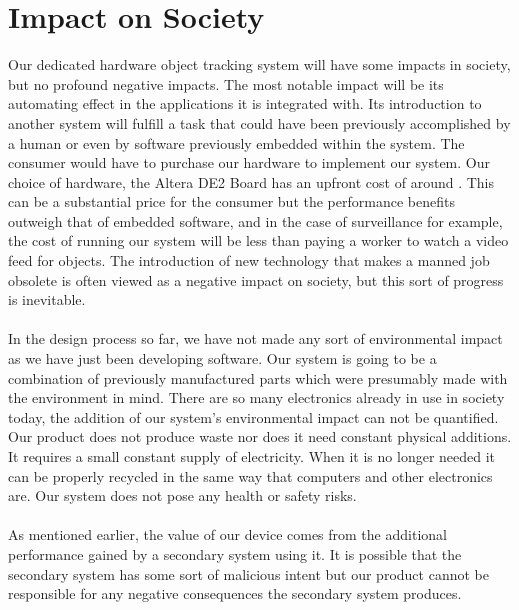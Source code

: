 \documentclass[11pt]{article} %
\begin{document}
\section{Impact on Society}
Our dedicated hardware object tracking system will have some impacts in society, but no profound negative impacts. The most notable impact will be its automating effect in the applications it is integrated with. Its introduction to another system will fulfill a task that could have been previously accomplished by a human or even by software previously embedded within the system. The consumer would have to purchase our hardware to implement our system. Our choice of hardware, the Altera DE2 Board has an upfront cost of around . This can be a substantial price for the consumer but the performance benefits outweigh that of embedded software, and in the case of surveillance for example, the cost of running our system will be less than paying a worker to watch a video feed for objects. The introduction of new technology that makes a manned job obsolete is often viewed as a negative impact on society, but this sort of progress is inevitable. \\\\
In the design process so far, we have not made any sort of environmental impact as we have just been developing software. Our system is going to be a combination of previously manufactured parts which were presumably made with the environment in mind. There are so many electronics already in use in society today, the addition of our system's environmental impact can not be quantified. Our product does not produce waste nor does it need constant physical additions. It requires a small constant supply of electricity. When it is no longer needed it can be properly recycled in the same way that computers and other electronics are. Our system does not pose any health or safety risks.\\\\
As mentioned earlier, the value of our device comes from the additional performance gained by a secondary system using it. It is possible that the secondary system has some sort of malicious intent but our product cannot be responsible for any negative consequences the secondary system produces. 
\end{document}
